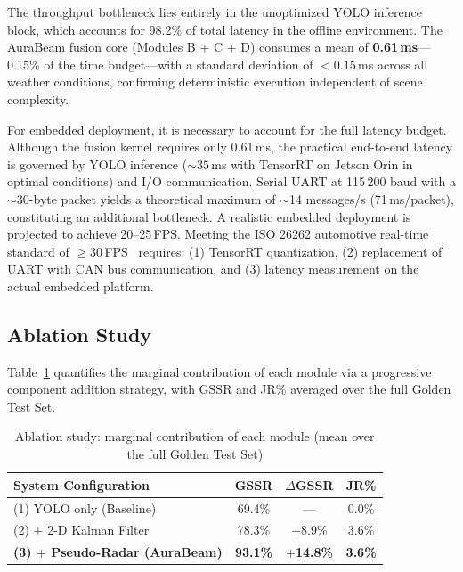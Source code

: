 \documentclass[pdflatex,sn-mathphys-num]{sn-jnl}%
\theoremstyle{thmstyleone}%
\theoremstyle{thmstyletwo}%
\theoremstyle{thmstylethree}%
\begin{document}
The throughput bottleneck lies entirely in the unoptimized YOLO
inference block, which accounts for 98.2\% of total latency in the
offline environment. The AuraBeam fusion core (Modules B + C + D)
consumes a mean of \textbf{0.61\,ms}---0.15\% of the time
budget---with a standard deviation of $< 0.15$\,ms across all
weather conditions, confirming deterministic execution independent of
scene complexity.

For embedded deployment, it is necessary to account for the full
latency budget. Although the fusion kernel requires only 0.61\,ms, the
practical end-to-end latency is governed by YOLO inference
(${\sim}35$\,ms with TensorRT on Jetson Orin in optimal conditions)
and I/O communication. Serial UART at 115\,200 baud with a
${\sim}$30-byte packet yields a theoretical maximum of ${\sim}$14
messages/s (71\,ms/packet), constituting an additional bottleneck.
A realistic embedded deployment is projected to achieve 20--25\,FPS.
Meeting the ISO 26262 automotive real-time standard of
$\geq$30\,FPS~\cite{ISO26262_2018} requires: (1) TensorRT quantization,
(2) replacement of UART with CAN bus communication, and (3) latency
measurement on the actual embedded platform.

\subsection{Ablation Study}
\label{subsec:ablation}

Table~\ref{tab:ablation} quantifies the marginal contribution of each
module via a progressive component addition strategy, with GSSR and
JR\% averaged over the full Golden Test Set.

\begin{table}[t]
\centering
\caption{Ablation study: marginal contribution of each module
         (mean over the full Golden Test Set)}
\label{tab:ablation}
%
\begin{tabular}{lccc}
\hline
\textbf{System Configuration}
  & \textbf{GSSR} & \textbf{$\Delta$GSSR} & \textbf{JR\%} \\
\hline
(1) YOLO only (Baseline)          & 69.4\%  & ---            & 0.0\% \\
(2) $+$ 2-D Kalman Filter         & 78.3\%  & $+$8.9\%       & 3.6\% \\
\textbf{(3) $+$ Pseudo-Radar (AuraBeam)}
  & \textbf{93.1\%} & \textbf{$+$14.8\%} & \textbf{3.6\%} \\
\hline
\end{tabular}%
\end{table}
\end{document}
